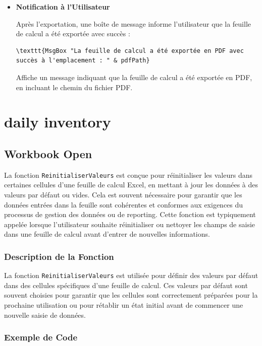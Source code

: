 \documentclass[a4paper, oneside, 12pt, final]{extreport}
\begin{document}
\begin{itemize}
\item \textbf{Notification à l'Utilisateur}

Après l'exportation, une boîte de message informe l'utilisateur que la feuille de calcul a été exportée avec succès :

\begin{lstlisting}
\texttt{MsgBox "La feuille de calcul a été exportée en PDF avec succès à l'emplacement : " & pdfPath}
\end{lstlisting}

Affiche un message indiquant que la feuille de calcul a été exportée en PDF, en incluant le chemin du fichier PDF.

\end{itemize}

\section{daily inventory}
\subsection{Workbook Open}

La fonction \texttt{ReinitialiserValeurs} est conçue pour réinitialiser les valeurs dans certaines cellules d'une feuille de calcul Excel, en mettant à jour les données à des valeurs par défaut ou vides. Cela est souvent nécessaire pour garantir que les données entrées dans la feuille sont cohérentes et conformes aux exigences du processus de gestion des données ou de reporting. Cette fonction est typiquement appelée lorsque l'utilisateur souhaite réinitialiser ou nettoyer les champs de saisie dans une feuille de calcul avant d'entrer de nouvelles informations.

\subsubsection{Description de la Fonction}

La fonction \texttt{ReinitialiserValeurs} est utilisée pour définir des valeurs par défaut dans des cellules spécifiques d'une feuille de calcul. Ces valeurs par défaut sont souvent choisies pour garantir que les cellules sont correctement préparées pour la prochaine utilisation ou pour rétablir un état initial avant de commencer une nouvelle saisie de données.

\subsubsection{Exemple de Code}
\end{document}
